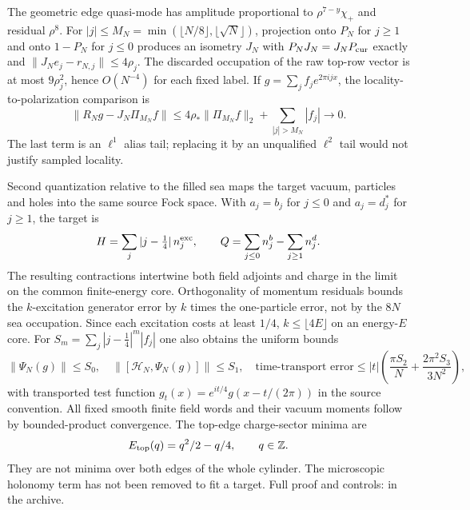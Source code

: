 The geometric edge quasi-mode has amplitude proportional to
$\rho^{7-y}\chi_+$ and residual $\rho^8$. For
$|j|\leq M_N=\min(\lfloor N/8\rfloor,\lfloor\sqrt N\rfloor)$,
projection onto $P_N$ for
$j\geq1$ and onto $1-P_N$ for $j\leq0$ produces an isometry $J_N$ with
$P_NJ_N=J_NP_{\rm cur}$ exactly and
$\|J_Ne_j-r_{N,j}\|\leq4\rho_j$.
The discarded occupation of the raw top-row vector is at most
$9\rho_j^2$, hence $O(N^{-4})$ for each fixed label.
If $g=\sum_j f_je^{2\pi ijx}$, the locality-to-polarization comparison is
\[
 \|R_Ng-J_N\Pi_{M_N}f\|
 \leq4\rho_*\|\Pi_{M_N}f\|_2+
             \sum_{|j|>M_N}|f_j|\longrightarrow0.
\]
The last term is an $\ell^1$ alias tail; replacing it by an unqualified
$\ell^2$ tail would not justify sampled locality.

Second quantization relative to the filled sea maps the target vacuum,
particles and holes into the same source Fock space. With
$a_j=b_j$ for $j\leq0$ and $a_j=d_j^*$ for $j\geq1$, the target is
\[
 H=\sum_j |j-\tfrac14|\,n_j^{\rm exc},\qquad
 Q=\sum_{j\leq0}n_j^b-\sum_{j\geq1}n_j^d.
\]
The resulting contractions intertwine both field adjoints and charge in
the limit on the common finite-energy core. Orthogonality of momentum
residuals bounds the $k$-excitation generator error by $k$ times the
one-particle error, not by the $8N$ sea occupation. Since each excitation
costs at least $1/4$, $k\leq\lfloor4E\rfloor$ on an energy-$E$ core.
For $S_m=\sum_j|j-\tfrac14|^m|f_j|$ one also obtains the uniform bounds
\[
 \|\Psi_N(g)\|\leq S_0,\quad
 \|[\mathcal H_N,\Psi_N(g)]\|\leq S_1,\quad
 \text{time-transport error}\leq
 |t|\left(\frac{\pi S_2}{N}+\frac{2\pi^2 S_3}{3N^2}\right),
\]
with transported test function
$g_t(x)=e^{it/4}g(x-t/(2\pi))$ in the source convention.
All fixed smooth finite field words and their vacuum moments follow by
bounded-product convergence. The top-edge charge-sector minima are
\[
 E_{\rm top}(q)=q^2/2-q/4,\qquad q\in\mathbb Z.
\]
They are not minima over both edges of the whole cylinder.
The microscopic holonomy term has not been removed to fit a target.
Full proof and controls:  in the archive.

